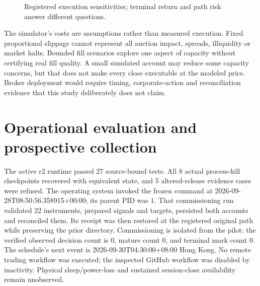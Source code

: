 \documentclass[11pt,a4paper]{article}
\begin{document}
\begin{figure}[htbp]

\caption{Registered execution sensitivities; terminal return and path risk answer different questions.}\label{fig:12}
\end{figure}

The simulator's costs are assumptions rather than measured execution. Fixed proportional slippage cannot represent all auction impact, spreads, illiquidity or market halts. Bounded fill scenarios explore one aspect of capacity without certifying real fill quality. A small simulated account may reduce some capacity concerns, but that does not make every close executable at the modeled price. Broker deployment would require timing, corporate-action and reconciliation evidence that this study deliberately does not claim.


\section{Operational evaluation and prospective collection}\label{sec:section-09}

The active r2 runtime passed 27 source-bound tests. All 8 actual process-kill checkpoints recovered with equivalent state, and 5 altered-release evidence cases were refused. The operating system invoked the frozen command at 2026-09-28T08:50:56.358915+00:00; its parent PID was 1. That commissioning run validated 22 instruments, prepared signals and targets, persisted both accounts and reconciled them. Its receipt was then restored at the registered original path while preserving the prior directory. Commissioning is isolated from the pilot: the verified observed decision count is 0, mature count 0, and terminal mark count 0. The schedule's next event is 2026-09-30T04:30:00+08:00 Hong Kong. No remote trading workflow was executed; the inspected GitHub workflow was disabled by inactivity. Physical sleep/power-loss and sustained session-close availability remain unobserved.
\end{document}
